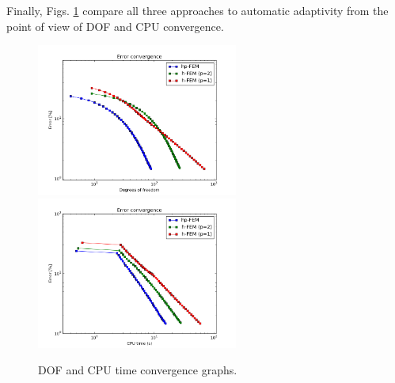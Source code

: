 Finally, Figs. \ref{fig:nist-7-conv} compare all
three approaches to automatic adaptivity from the point
of view of DOF and CPU convergence.

\begin{figure}[!ht]
\centering
\includegraphics[height=5cm]{nist/nist-7/conv_dof_aniso.png}\ \
\includegraphics[height=5cm]{nist/nist-7/conv_cpu_aniso.png}
\caption{DOF and CPU time convergence graphs.}
\label{fig:nist-7-conv}
\end{figure}

